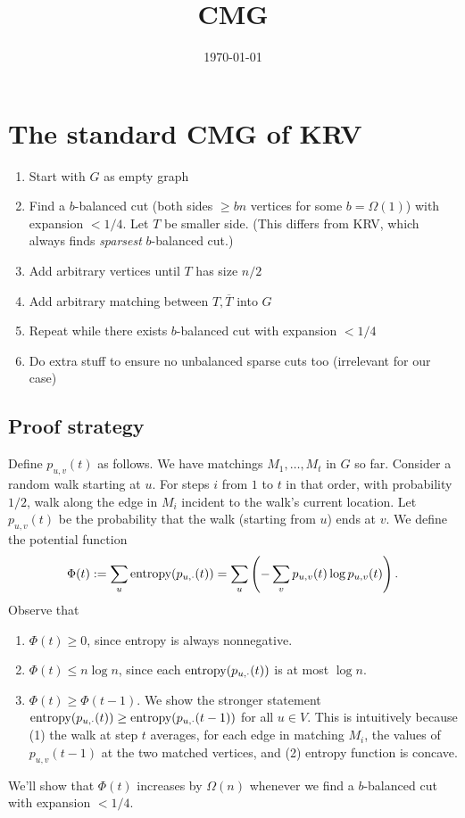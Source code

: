 \documentclass{article}
\newcommand{\ent}{\textup{entropy}}
\begin{document}
\title{CMG}
\date{\today}
\maketitle

\section{The standard CMG of KRV}

\begin{enumerate}
\item Start with $G$ as empty graph
\item Find a $b$-balanced cut (both sides $\ge bn$ vertices for some $b=\Omega(1)$) with expansion $< 1/4$. Let $T$ be smaller side. (This differs from KRV, which always finds \emph{sparsest} $b$-balanced cut.)
\item Add arbitrary vertices until $T$ has size $n/2$
\item Add arbitrary matching between $T,\overline T$ into $G$
\item Repeat while there exists $b$-balanced cut with expansion $<1/4$
\item Do extra stuff to ensure no unbalanced sparse cuts too (irrelevant for our case)
\end{enumerate}

\subsection{Proof strategy}
Define $p_{u,v}(t)$ as follows. We have matchings $M_1,\ldots,M_t$ in $G$ so far. Consider a random walk starting at $u$. For steps $i$ from $1$ to $t$ in that order, with probability $1/2$, walk along the edge in $M_i$ incident to the walk's current location. Let $p_{u,v}(t)$ be the probability that the walk (starting from $u$) ends at $v$. We define the potential function
\[ \Phi(t) := \sum_u \ent(p_{u,\cdot}(t)) = \sum_u \left( -\sum_v p_{u,v}(t)\log p_{u,v}(t)\right) .\]
Observe that
\begin{enumerate}
\item $\Phi(t) \ge 0$, since entropy is always nonnegative.
\item $\Phi(t) \le n\log n$, since each $\ent(p_{u,\cdot}(t))$ is at most $\log n$.
\item $\Phi(t)\ge\Phi(t-1)$. We show the stronger statement $\ent(p_{u,\cdot}(t)) \ge \ent(p_{u,\cdot}(t-1))$ for all $u\in V$. This is intuitively because (1) the walk at step $t$ averages, for each edge in matching $M_i$, the values of $p_{u,v}(t-1)$ at the two matched vertices, and (2) entropy function is concave.
\end{enumerate}
We'll show that $\Phi(t)$ increases by $\Omega(n)$ whenever we find a $b$-balanced cut with expansion $<1/4$.
\end{document}
